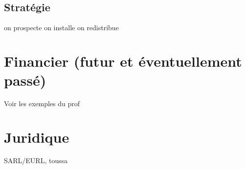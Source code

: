 \documentclass[10pt]{article}
\begin{document}
\subsection{Stratégie}
\label{sub:strategie}
on prospecte
on installe
on redistribue


\section{Financier (futur et éventuellement passé)}
\label{sec:financier}
Voir les exemples du prof

\section{Juridique}
\label{sec:juridique}
SARL/EURL, toussa
\end{document}
